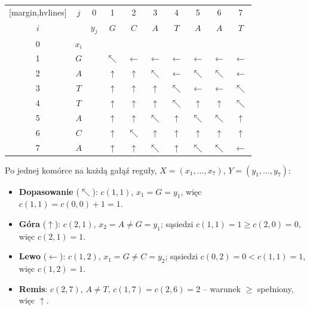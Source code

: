 \begin{aztable}
\begin{minipage}{0.48\linewidth}
\begin{NiceTabular}{cc|c|ccccccc}[margin,hvlines]
			    & $j$   & 0     & 1          & 2            & 3            & 4            & 5            & 6            & 7            \\
			$i$ &       & $y_j$ & $G$        & $C$          & $A$          & $T$          & $A$          & $A$          & $T$          \\
			   & $x_i$ &       &            &              &              &              &              &              &              \\
			1   & $G$   &       & \color{accentB}$\nwarrow$ & $\leftarrow$ & $\leftarrow$ & $\leftarrow$ & $\leftarrow$ & $\leftarrow$ & $\leftarrow$ \\
			2   & $A$   &       & $\uparrow$ & $\uparrow$   & \color{accentB}$\nwarrow$ & $\leftarrow$ & $\nwarrow$   & $\nwarrow$   & $\leftarrow$ \\
			3   & $T$   &       & $\uparrow$ & $\uparrow$   & $\uparrow$   & $\nwarrow$   & $\leftarrow$ & $\leftarrow$ & $\nwarrow$   \\
			4   & $T$   &       & $\uparrow$ & $\uparrow$   & $\uparrow$   & \color{accentB}$\nwarrow$ & $\uparrow$ & $\uparrow$ & $\nwarrow$ \\
			5   & $A$   &       & $\uparrow$ & $\uparrow$   & $\nwarrow$   & $\uparrow$   & \color{accentB}$\nwarrow$ & $\nwarrow$ & $\uparrow$ \\
			6   & $C$   &       & $\uparrow$ & $\nwarrow$   & $\uparrow$   & $\uparrow$   & $\uparrow$   & $\uparrow$   & $\uparrow$   \\
			7   & $A$   &       & $\uparrow$ & $\uparrow$   & $\nwarrow$   & $\uparrow$   & $\nwarrow$   & \color{accentB}$\nwarrow$ & $\leftarrow$ \\
		\end{NiceTabular}
	\end{minipage}
\end{aztable}

\begin{dygresja}
	Po jednej komórce na każdą gałąź reguły,
	$X = (x_1, \dots, x_7)$, $Y = (y_1, \dots, y_7)$:
	\begin{itemize}
		\item \textbf{Dopasowanie} ($\nwarrow$): $c(1, 1)$, $x_1 = G = y_1$, więc
		      $c(1, 1) = c(0, 0) + 1 = 1$.
		\item \textbf{Góra} ($\uparrow$): $c(2, 1)$, $x_2 = A \neq G = y_1$; sąsiedzi
		      $c(1, 1) = 1 \geq c(2, 0) = 0$, więc $c(2, 1) = 1$.
		\item \textbf{Lewo} ($\leftarrow$): $c(1, 2)$, $x_1 = G \neq C = y_2$; sąsiedzi
		      $c(0, 2) = 0 < c(1, 1) = 1$, więc $c(1, 2) = 1$.
		\item \textbf{Remis}: $c(2, 7)$, $A \neq T$, $c(1, 7) = c(2, 6) = 2$ -- warunek
		      $\geq$ spełniony, więc $\uparrow$.
	\end{itemize}
\end{dygresja}

